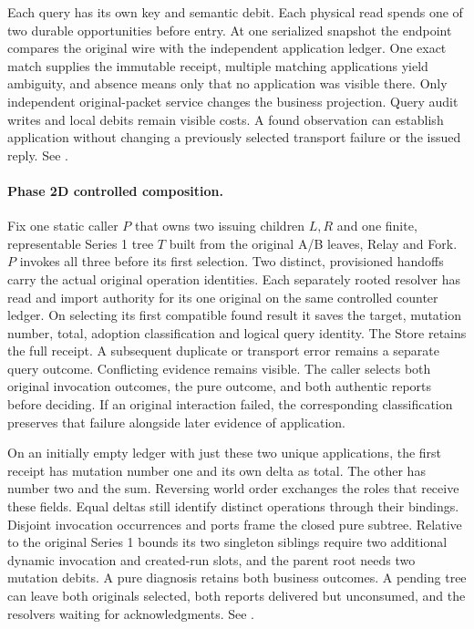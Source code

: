 \documentclass[11pt,a4paper]{article}
\theoremstyle{definition}
\theoremstyle{remark}
\begin{document}
Each query has its own key and semantic debit. Each physical read spends one of two durable opportunities before entry. At one serialized snapshot the endpoint compares the original wire with the independent application ledger. One exact match supplies the immutable receipt, multiple matching applications yield ambiguity, and absence means only that no application was visible there. Only independent original-packet service changes the business projection. Query audit writes and local debits remain visible costs. A found observation can establish application without changing a previously selected transport failure or the issued reply. See .

\paragraph{Phase 2D controlled composition.} Fix one static caller $P$ that owns two issuing children $L,R$ and one finite, representable Series 1 tree $T$ built from the original A/B leaves, Relay and Fork. $P$ invokes all three before its first selection. Two distinct, provisioned handoffs carry the actual original operation identities. Each separately rooted resolver has read and import authority for its one original on the same controlled counter ledger. On selecting its first compatible found result it saves the target, mutation number, total, adoption classification and logical query identity. The Store retains the full receipt. A subsequent duplicate or transport error remains a separate query outcome. Conflicting evidence remains visible. The caller selects both original invocation outcomes, the pure outcome, and both authentic reports before deciding. If an original interaction failed, the corresponding classification preserves that failure alongside later evidence of application.

On an initially empty ledger with just these two unique applications, the first receipt has mutation number one and its own delta as total. The other has number two and the sum. Reversing world order exchanges the roles that receive these fields. Equal deltas still identify distinct operations through their bindings. Disjoint invocation occurrences and ports frame the closed pure subtree. Relative to the original Series 1 bounds its two singleton siblings require two additional dynamic invocation and created-run slots, and the parent root needs two mutation debits. A pure diagnosis retains both business outcomes. A pending tree can leave both originals selected, both reports delivered but unconsumed, and the resolvers waiting for acknowledgments. See .
\end{document}
